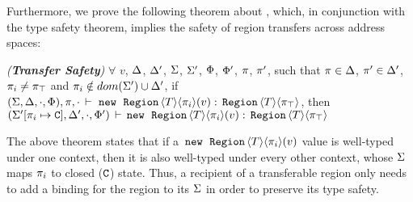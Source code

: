 Furthermore, we prove the following theorem about \FB, which, in
conjunction with the type safety theorem, implies the safety of region
transfers across address spaces:
\begin{theorem}
\emph{(\textbf{Transfer Safety})}
\label{thm:fb-type-safety}
$\forall$ $v$, $\Delta$, $\Delta'$, $\Sigma$, $\Sigma'$, $\Phi$,
$\Phi'$, $\pi$, $\pi'$, such that $\pi \in \Delta$, $\pi' \in
\Delta'$, $\pi_i \neq \pi_{\top}$ and
$\pi_i \notin dom(\Sigma') \cup \Delta'$, if $(\Sigma,\Delta,\cdot,\Phi),\pi,
\cdot\,\vdash\,\,{\tt new}\,\; \,{\tt Region}\,\langle T \rangle\langle \pi_i \rangle(v):\,{\tt Region}\,\langle T \rangle\langle \pi_{\top} \rangle$, then
$(\Sigma'[\pi_i \mapsto \mathtt{C}],\Delta',\cdot,\Phi')\,\vdash\,\\\,{\tt new}\,\; \,{\tt Region}\,\langle T \rangle\langle \pi_i \rangle(v):\,{\tt Region}\,\langle T \rangle\langle \pi_{\top} \rangle$
\end{theorem}
The above theorem states that if a $\,{\tt new}\,\; \,{\tt Region}\,\langle T \rangle\langle \pi_i \rangle(v)$ value
is well-typed under one context, then it is also well-typed under
every other context, whose $\Sigma$ maps $\pi_i$ to closed
($\mathtt{C}$) state.  Thus, a recipient of a transferable region only
needs to add a binding for the region to its $\Sigma$ in order to
preserve its type safety. 
